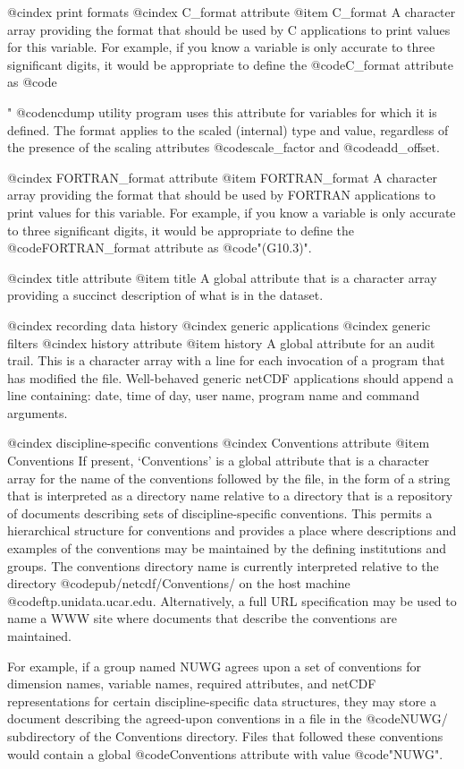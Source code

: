 @cindex print formats
@cindex C_format attribute
@item C_format
A character array providing the format that should be used by C applications
to print values for this variable.  For example, if you know a variable is
only accurate to three significant digits, it would be appropriate to
define the @code{C_format} attribute as @code{"%
@code{ncdump} utility program uses this attribute for variables for
which it is defined.
The format applies to the scaled (internal) type and value, regardless
of the presence of the scaling attributes
@code{scale_factor} and @code{add_offset}.

@cindex FORTRAN_format attribute
@item FORTRAN_format
A character array providing the format that should be used by FORTRAN
applications
to print values for this variable.  For example, if you know a variable is
only accurate to three significant digits, it would be appropriate to
define the @code{FORTRAN_format} attribute as @code{"(G10.3)"}.

@cindex title attribute
@item title
A global attribute that is a character array providing a succinct
description of what is in the dataset.

@cindex recording data history
@cindex generic applications
@cindex generic filters
@cindex history attribute
@item history
A global attribute for an audit trail.
This is a character array with a line for each invocation of a program
that has modified the file.
Well-behaved generic netCDF applications should append a line
containing: date, time of day, user name, program name and command arguments.

@cindex discipline-specific conventions
@cindex Conventions attribute
@item Conventions
If present, `Conventions' is a global attribute that is a character
array for the name of the conventions followed by the file, in the form
of a string that is interpreted as a directory name relative to a
directory that is a repository of documents describing sets of
discipline-specific conventions.  This permits a hierarchical structure
for conventions and provides a place where descriptions and examples of
the conventions may be maintained by the defining institutions and
groups.  The conventions directory name is currently interpreted relative to
the directory @code{pub/netcdf/Conventions/} on the host machine
@code{ftp.unidata.ucar.edu}.  Alternatively, a full URL specification
may be used to name a WWW site where documents that describe the
conventions are maintained.

For example, if a group named NUWG agrees upon a set of conventions for
dimension names, variable names, required attributes, and netCDF
representations for certain discipline-specific data structures, they
may store a document describing the agreed-upon conventions in a file in
the @code{NUWG/} subdirectory of the Conventions directory.
Files that followed these conventions would contain a global
@code{Conventions} attribute with value @code{"NUWG"}.

}
